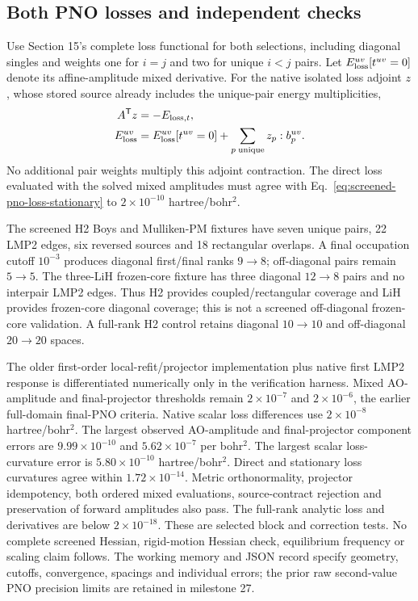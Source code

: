 \documentclass[11pt]{article}
\begin{document}
\subsection{Both PNO losses and independent checks}
Use Section 15's complete loss functional for both selections, including
diagonal singles and weights one for $i=j$ and two for unique $i<j$ pairs.
Let $E_{\rm loss}^{uv}[t^{uv}=0]$ denote its affine-amplitude mixed derivative.
For the native isolated loss adjoint $z$, whose stored source already
includes the unique-pair energy multiplicities,
\begin{align}
 A^{\mathsf T}z&=-E_{{\rm loss},t},\\
 E_{\rm loss}^{uv}
 &=E_{\rm loss}^{uv}[t^{uv}=0]+
   \sum_{p\;\mathrm{unique}}z_p:b_p^{uv}.
 \label{eq:screened-pno-loss-stationary}
\end{align}
No additional pair weights multiply this adjoint contraction. The direct
loss evaluated with the solved mixed amplitudes must agree with
Eq.~\eqref{eq:screened-pno-loss-stationary} to $2\times10^{-10}$ hartree/bohr$^2$.

The screened H2 Boys and Mulliken-PM fixtures have seven unique pairs,
22 LMP2 edges, six reversed sources and 18 rectangular overlaps. A final
occupation cutoff $10^{-3}$ produces diagonal first/final ranks $9\to8$;
off-diagonal pairs remain $5\to5$. The three-LiH frozen-core fixture has
three diagonal $12\to8$ pairs and no interpair LMP2 edges. Thus H2 provides
coupled/rectangular coverage and LiH provides frozen-core diagonal coverage;
this is not a screened off-diagonal frozen-core validation. A full-rank H2
control retains diagonal $10\to10$ and off-diagonal $20\to20$ spaces.

The older first-order local-refit/projector implementation plus native first
LMP2 response is differentiated numerically only in the verification harness.
Mixed AO-amplitude and final-projector thresholds remain $2\times10^{-7}$
and $2\times10^{-6}$, the earlier full-domain final-PNO criteria.
Native scalar loss differences use $2\times10^{-8}$ hartree/bohr$^2$.
The largest observed AO-amplitude and final-projector component errors are
$9.99\times10^{-10}$ and $5.62\times10^{-7}$ per bohr$^2$. The largest
scalar loss-curvature error is $5.80\times10^{-10}$ hartree/bohr$^2$.
Direct and stationary loss curvatures agree within $1.72\times10^{-14}$.
Metric orthonormality, projector idempotency, both ordered mixed evaluations,
source-contract rejection and preservation of forward amplitudes also pass.
The full-rank analytic loss and derivatives are below $2\times10^{-18}$.
These are selected block and correction tests. No complete screened Hessian,
rigid-motion Hessian check, equilibrium frequency or scaling claim follows.
The working memory and JSON record specify geometry, cutoffs, convergence,
spacings and individual errors; the prior raw second-value PNO precision
limits are retained in milestone 27.
\end{document}
